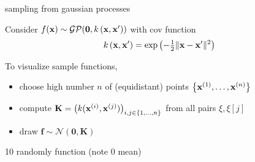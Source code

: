 \documentclass[11pt,compress,t,notes=noshow, xcolor=table]{beamer}
\begin{document}
\begin{framei}[sep=L]{sampling from gaussian processes}
\item Consider $\fx \sim \mathcal{GP}(\zero, \kxxp)$ with cov function
$$ \kxxp = \exp\left(-\tfrac{1}{2}\|\xv - \xv^\prime\|^2\right)$$
\item To visualize sample functions, 
\begin{itemize}
\item choose high number $n$ of (equidistant) points $\xdat$
  \item compute $\Kmat = \left(k(\xi, \xi[j]) \right)_{i,j \in \nset}$ from all pairs $\xi, \xi[j]$ 
  \item draw $\bm{f} \sim \mathcal{N}(\bm{0}, \bm{K})$ 
\end{itemize}
\item 10 randomly function (note 0 mean)
\vfill
{}
\end{framei}









\end{document}
